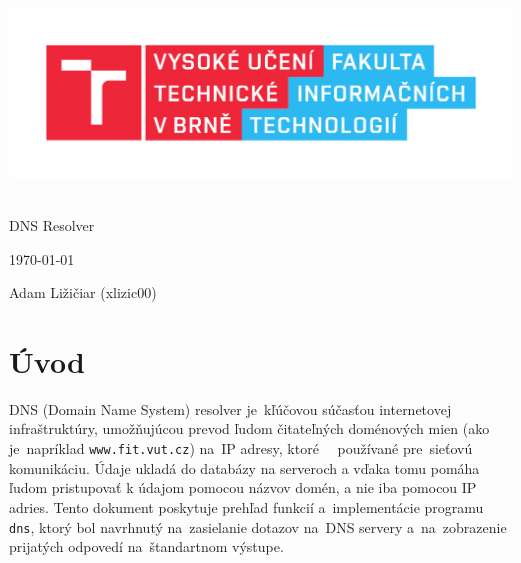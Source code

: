 \documentclass[a4paper, 11pt]{article}
\begin{document}
	\begin{titlepage}
		\begin{center}
			\includegraphics[width=0.77\linewidth]{res/logo_FIT.pdf} \\


			 \\
			\LARGE{DNS Resolver} \\
		\end{center}

		\begin{minipage}[b]{0.4 \textwidth}
			\raggedright
			{\Large \today}
		\end{minipage}
		\hfill
		\begin{minipage}[b]{0.6 \textwidth}
			\raggedleft
			\Large
			Adam Ližičiar (xlizic00)\\
		\end{minipage}		
	\end{titlepage}

	\setcounter{page}{1}
	\tableofcontents
	\clearpage

	\setcounter{page}{1}
	
	\section{Úvod}
	DNS (Domain Name System) resolver je~kľúčovou súčasťou internetovej infraštruktúry, umožňujúcou prevod ľudom čitateľných doménových mien (ako je~napríklad \texttt{www.fit.vut.cz}) na~IP adresy, ktoré~ ~používané pre~sieťovú komunikáciu. Údaje ukladá do databázy na serveroch a vďaka tomu pomáha ľudom pristupovať k údajom pomocou názvov domén, a nie iba pomocou IP adries. Tento dokument poskytuje prehľad funkcií a~implementácie programu \texttt{dns}, ktorý bol navrhnutý na~zasielanie dotazov na~DNS servery a~na~zobrazenie prijatých odpovedí na~štandartnom výstupe.\newline
\end{document}
